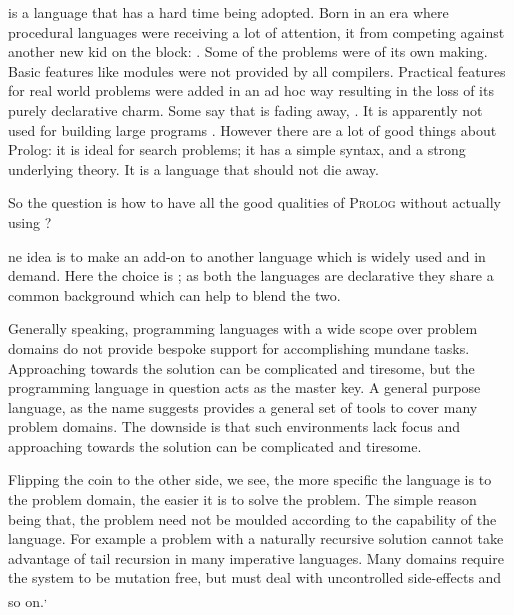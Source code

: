 \documentclass[thesis-solanki.tex]{subfiles}
\begin{document}
 is a language that has a hard time being adopted.
Born in an era where procedural languages were receiving a lot of attention, it  from competing against another
new kid on the block: .
Some of the problems were of its own making.
Basic features like modules were not provided by all compilers.
Practical features for real world problems were added in an ad hoc way resulting in the loss of its purely declarative
charm.
Some say that  is fading away, \cite{website:prolog-steam,website:prolog-death,website:prolog-killer}.
It is apparently not used for building large programs \cite{wikiprolog,somogyi1995logic,website:prolog1000db}.
However there are a lot of good things about Prolog: it is ideal for search problems; it has a simple syntax, and a
strong underlying theory.
It is a language that should not die away.

So the question is how to have all the good qualities of \textsc{Prolog} without actually using ?

ne idea is to make  an add-on to another language which is widely used and in demand.
Here the choice is ; as both the languages are declarative they share a common background which can
help to blend the two.

Generally speaking, programming languages with a wide scope over problem domains do not provide bespoke support for
accomplishing  mundane tasks.
Approaching towards the solution can be complicated and tiresome, but the programming language in question acts as the
master key.%
A general purpose language, as the name suggests\yyy{}{\large ,} provides a general set of tools to cover many
problem domains.
The downside is that such environments lack focus and approaching towards the solution can be complicated and
tiresome.


Flipping the coin to the other side, we see, the more specific the language is to the problem domain, the easier it
is to solve the problem.
The simple reason being that, the problem need not be moulded according to the capability  of the
language.
For example\yyy{}{,} a problem with a naturally recursive solution cannot take advantage of tail recursion in many
imperative languages.
Many domains require the system to be mutation free, but must deal with uncontrolled side-effects and so
on.\textsuperscript{,}%
\end{document}

